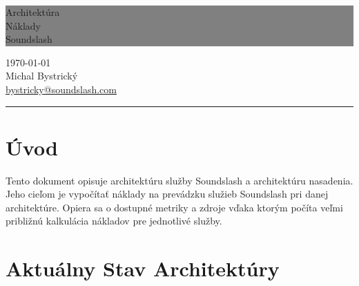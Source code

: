 \documentclass[11pt]{article}
\newcommand{\HRule}[1]{\hfill \rule{0.2\linewidth}{#1}}
\newif\ifknowhow
\begin{document}
\knowhowtrue
  





\thispagestyle{empty} 


\colorbox{grey}{
	\parbox[t]{1.0\linewidth}{
		\centering \fontsize{50pt}{80pt}\selectfont
		\vspace*{0.7cm} 
		
		\hfill Architektúra \\
		\hfill Náklady \\
		\hfill Soundslash  \\
		
		\vspace*{0.7cm} 
	}
}


\vfill 

{\centering \large
\ifknowhow 
\else \hfill V tomto dokumente boli vynechané časti.\\ \fi 
\hfill \today \\
\hfill Michal Bystrický \\
\hfill \href{mailto:bystricky@soundslash.com}{bystricky@soundslash.com} \\

\HRule{1pt}} 


\clearpage 


\tableofcontents


\clearpage

\section{Úvod}

Tento dokument opisuje architektúru služby Soundslash a architektúru nasadenia. Jeho cieľom je vypočítať náklady na prevádzku služieb Soundslash pri danej architektúre. Opiera sa o dostupné metriky a zdroje vďaka ktorým počíta veľmi približnú kalkulácia nákladov pre jednotlivé služby.


\section{Aktuálny Stav Architektúry}
\end{document}
